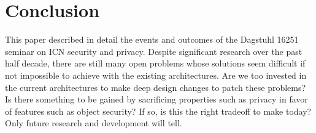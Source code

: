 \documentclass{sig-alternate-10pt}
\begin{document}
\section{Conclusion}
This paper described in detail the events and outcomes of the Dagstuhl 16251
seminar on ICN security and privacy. Despite significant research over the past
half decade, there are still many open problems whose solutions seem difficult
if not impossible to achieve with the existing architectures. Are we too invested
in the current architectures to make deep design changes to patch these problems?
Is there something to be gained by sacrificing properties such as privacy in favor
of features such as object security? If so, is this the right tradeoff to make
today? Only future research and development will tell.

\small


\end{document}
